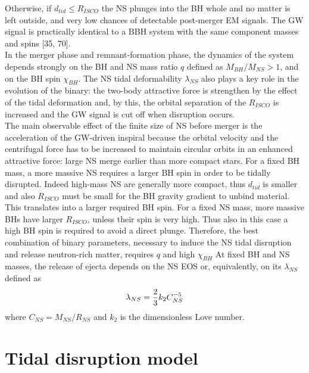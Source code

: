 \documentclass[binding=0.6cm, LaM]{sapthesis}
\begin{document}
        Otherwise, if $d_{tid} \leq R_{ISCO}$ the NS plunges into the BH whole and no matter is left outside,
        and very low chances of detectable post-merger EM signals.
        The GW signal is practically identical to a BBH system with the same component masses and spins [35, 70]. \\
        In the merger phase and remnant-formation phase, the dynamics of the system depends
	strongly on the BH and NS mass ratio $q$ defined as $M_{BH}/M_{NS} > 1$, and on the BH spin $\chi_{BH}$.
        The NS tidal deformability $\lambda_{NS}$ also plays a key role in the evolution of the binary:
        the two-body attractive force is strengthen by the effect of the tidal deformation and, by this,
        the orbital separation of the $R_{ISCO}$ is increased and the GW  signal  is  cut  off  when
        disruption occurs. \\
        The main observable effect of the finite size of NS before merger is the acceleration of the GW-driven inspiral
        because the orbital velocity and the centrifugal force has to be increased to maintain circular orbits
        in an enhanced attractive force: large NS merge earlier than more compact stars.
        For a fixed BH mass, a more massive NS requires a larger BH spin in order to be tidally disrupted.
        Indeed high-mass NS are generally more compact, thus $d_{tid}$ is smaller and also
        $R_{ISCO}$ must be small for the BH gravity gradient to unbind material.
        This translates into a larger required BH spin. For a fixed NS mass, more massive BHs have larger
        $R_{ISCO}$, unless their spin is very high. Thus also in this case a high BH spin is required
        to  avoid  a  direct  plunge.  Therefore,  the  best  combination  of binary parameters,
        necessary to induce the NS tidal disruption and release neutron-rich matter, requires $q$ and high $\chi_{BH}$
        At fixed BH and NS masses, the release of ejecta depends on the NS EOS or, equivalently,
        on its $\lambda_{NS}$ defined as
                \begin{equation}
                        \lambda_{NS} = {{2} \over {3}} k_2 C_{NS}^{-5}
                \end{equation}
        where $C_{NS} = M_{NS}/R_{NS}$ and $k_2$ is the dimensionless Love number.

\section{Tidal disruption model}
\end{document}
